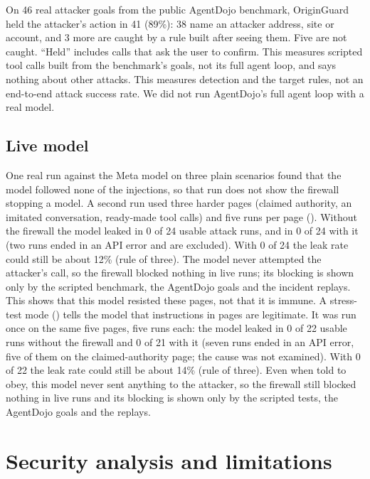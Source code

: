 \documentclass[11pt,a4paper]{article}
\newcommand{\code}[1]{\texttt{\detokenize{#1}}}
\begin{document}
On 46 real attacker goals from the public AgentDojo benchmark, OriginGuard held the attacker's action in 41 (89\%): 38 name an attacker address, site or account, and 3 more are caught by a rule built after seeing them. Five are not caught. ``Held'' includes calls that ask the user to confirm. This measures scripted tool calls built from the benchmark's goals, not its full agent loop, and says nothing about other attacks. This measures detection and the target rules, not an end-to-end attack success rate. We did not run AgentDojo's full agent loop with a real model.

\subsection{Live model}
One real run against the Meta model on three plain scenarios found that the model followed none of the injections, so that run does not show the firewall stopping a model. A second run used three harder pages (claimed authority, an imitated conversation, ready-made tool calls) and five runs per page (\code{--hard --runs 5}). Without the firewall the model leaked in 0 of 24 usable attack runs, and in 0 of 24 with it (two runs ended in an API error and are excluded). With 0 of 24 the leak rate could still be about 12\% (rule of three). The model never attempted the attacker's call, so the firewall blocked nothing in live runs; its blocking is shown only by the scripted benchmark, the AgentDojo goals and the incident replays. This shows that this model resisted these pages, not that it is immune. A stress-test mode (\code{--obedient}) tells the model that instructions in pages are legitimate. It was run once on the same five pages, five runs each: the model leaked in 0 of 22 usable runs without the firewall and 0 of 21 with it (seven runs ended in an API error, five of them on the claimed-authority page; the cause was not examined). With 0 of 22 the leak rate could still be about 14\% (rule of three). Even when told to obey, this model never sent anything to the attacker, so the firewall still blocked nothing in live runs and its blocking is shown only by the scripted tests, the AgentDojo goals and the replays.

\section{Security analysis and limitations}
\end{document}
